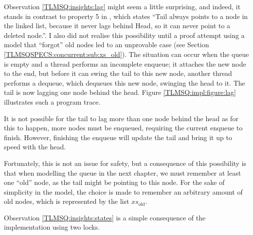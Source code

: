 \documentclass[a4paper, 10pt]{report}
\theoremstyle{definition}
\newcommand{\xsold}{xs_{\mathrm{old}}}
\begin{document}
Observation \ref{TLMSQ:insights:lag} might seem a little surprising, and indeed, it stands in contrast to property 5 in \citet{DBLP:conf/podc/MichaelS96}, which states \enquote{Tail always points to a node in the linked list, because it never lags behind Head, so it can never point to a deleted node.}. I also did not realise this possibility until a proof attempt using a model that ``forgot'' old nodes led to an unprovable case (see Section \ref{TLMSQSPECS:concurrent:sub:xs_old}). The situation can occur when the queue is empty and a thread performs an incomplete enqueue; it attaches the new node to the end, but before it can swing the tail to this new node, another thread performs a dequeue, which dequeues this new node, swinging the head to it. The tail is now lagging one node behind the head. Figure \ref{TLMSQ:impl:figure:lag} illustrates such a program trace.

It is not possible for the tail to lag more than one node behind the head as for this to happen, more nodes must be enqueued, requiring the current enqueue to finish. However, finishing the enqueue will update the tail and bring it up to speed with the head.

Fortunately, this is not an issue for safety, but a consequence of this possibility is that when modelling the queue in the next chapter, we must remember at least one ``old'' node, as the tail might be pointing to this node. For the sake of simplicity in the model, the choice is made to remember an arbitrary amount of old nodes, which is represented by the list $\xsold$.

Observation \ref{TLMSQ:insights:states} is a simple consequence of the implementation using two locks.
\end{document}
